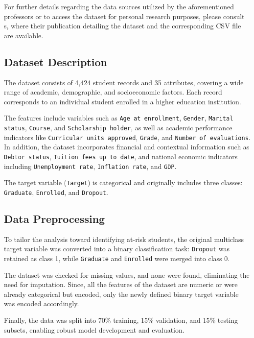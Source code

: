 \documentclass[runningheads]{llncs}
\begin{document}
For further details regarding the data sources utilized by the aforementioned professors or to access the dataset for personal research purposes, please consult \cite{valentim_realinho_2021_5777340}\cite{highered2022kaggle}s, where their publication detailing the dataset and the corresponding CSV file are available.

\subsection{Dataset Description}

The dataset consists of 4,424 student records and 35 attributes, covering a wide range of academic, demographic, and socioeconomic factors. Each record corresponds to an individual student enrolled in a higher education institution.

The features include variables such as \texttt{Age at enrollment}, \texttt{Gender}, \texttt{Marital status}, \texttt{Course}, and \texttt{Scholarship holder}, as well as academic performance indicators like \texttt{Curricular units approved}, \texttt{Grade}, and \texttt{Number of evaluations}. In addition, the dataset incorporates financial and contextual information such as \texttt{Debtor status}, \texttt{Tuition fees up to date}, and national economic indicators including \texttt{Unemployment rate}, \texttt{Inflation rate}, and \texttt{GDP}.

The target variable (\texttt{Target}) is categorical and originally includes three classes: \texttt{Graduate}, \texttt{Enrolled}, and \texttt{Dropout}.

\subsection{Data Preprocessing}

To tailor the analysis toward identifying at-risk students, the original multiclass target variable was converted into a binary classification task: \texttt{Dropout} was retained as class 1, while \texttt{Graduate} and \texttt{Enrolled} were merged into class 0.

The dataset was checked for missing values, and none were found, eliminating the need for imputation. Since, all the features of the dataset are numeric or were already categorical but encoded, only the newly defined binary target variable was encoded accordingly.

Finally, the data was split into 70\% training, 15\% validation, and 15\% testing subsets, enabling robust model development and evaluation.
\end{document}
